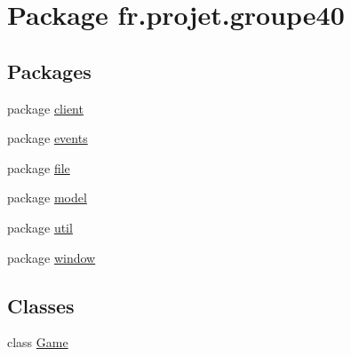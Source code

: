 \hypertarget{namespacefr_1_1projet_1_1groupe40}{}\section{Package fr.\+projet.\+groupe40}
\label{namespacefr_1_1projet_1_1groupe40}
\subsection*{Packages}
\begin{DoxyCompactItemize}
\item 
package \hyperlink{namespacefr_1_1projet_1_1groupe40_1_1client}{client}
\item 
package \hyperlink{namespacefr_1_1projet_1_1groupe40_1_1events}{events}
\item 
package \hyperlink{namespacefr_1_1projet_1_1groupe40_1_1file}{file}
\item 
package \hyperlink{namespacefr_1_1projet_1_1groupe40_1_1model}{model}
\item 
package \hyperlink{namespacefr_1_1projet_1_1groupe40_1_1util}{util}
\item 
package \hyperlink{namespacefr_1_1projet_1_1groupe40_1_1window}{window}
\end{DoxyCompactItemize}
\subsection*{Classes}
\begin{DoxyCompactItemize}
\item 
class \hyperlink{classfr_1_1projet_1_1groupe40_1_1_game}{Game}
\end{DoxyCompactItemize}
